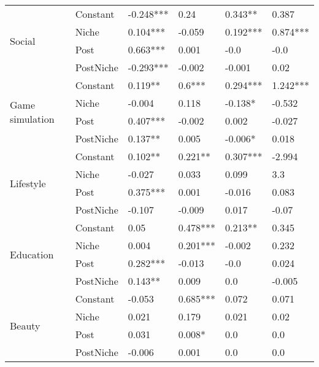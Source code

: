 \begin{longtable}[h!]{llllll}
\cline{1-6}
\multirow{4}{*}{Social} & Constant &           -0.248*** &        0.24 &    0.343** &      0.387 \\
          & Niche &            0.104*** &      -0.059 &   0.192*** &   0.874*** \\
          & Post &            0.663*** &       0.001 &       -0.0 &       -0.0 \\
          & PostNiche &           -0.293*** &      -0.002 &     -0.001 &       0.02 \\
\cline{1-6}
\multirow{4}{*}{Game simulation} & Constant &             0.119** &      0.6*** &   0.294*** &   1.242*** \\
          & Niche &              -0.004 &       0.118 &    -0.138* &     -0.532 \\
          & Post &            0.407*** &      -0.002 &      0.002 &     -0.027 \\
          & PostNiche &             0.137** &       0.005 &    -0.006* &      0.018 \\
\cline{1-6}
\multirow{4}{*}{Lifestyle} & Constant &             0.102** &     0.221** &   0.307*** &     -2.994 \\
          & Niche &              -0.027 &       0.033 &      0.099 &        3.3 \\
          & Post &            0.375*** &       0.001 &     -0.016 &      0.083 \\
          & PostNiche &              -0.107 &      -0.009 &      0.017 &      -0.07 \\
\cline{1-6}
\multirow{4}{*}{Education} & Constant &                0.05 &    0.478*** &    0.213** &      0.345 \\
          & Niche &               0.004 &    0.201*** &     -0.002 &      0.232 \\
          & Post &            0.282*** &      -0.013 &       -0.0 &      0.024 \\
          & PostNiche &             0.143** &       0.009 &        0.0 &     -0.005 \\
\cline{1-6}
\multirow{4}{*}{Beauty} & Constant &              -0.053 &    0.685*** &      0.072 &      0.071 \\
          & Niche &               0.021 &       0.179 &      0.021 &       0.02 \\
          & Post &               0.031 &      0.008* &        0.0 &        0.0 \\
          & PostNiche &              -0.006 &       0.001 &        0.0 &        0.0 \\

\end{longtable}
